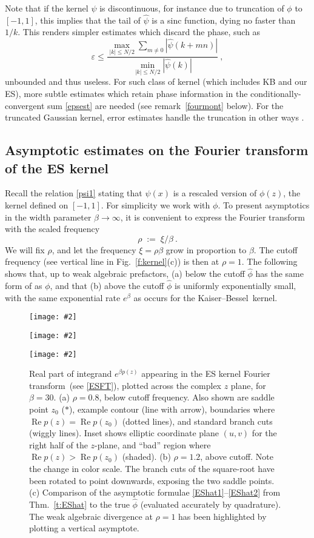 \documentclass[10pt]{article}
\newcommand{\be}{\begin{equation}}
\newcommand{\ee}{\end{equation}}
\newcommand{\bfi}{\begin{figure}}
\newcommand{\efi}{\end{figure}}
\newcommand{\ca}[2]{\caption{#1 \label{#2}}}
\newcommand{\bmp}[1]{\begin{minipage}{#1}}
\newcommand{\emp}{\end{minipage}}
\newcommand{\pig}[2]{\bmp{#1}\texttt{[image: \#2]}\emp}
\newcommand{\eps}{\varepsilon}
\DeclareMathOperator{\re}{Re}
\newcommand{\freq}{\beta}          %
\newcommand{\KB}{Kaiser--Bessel}
\newcommand{\FT}{Fourier transform}
\begin{document}
Note that if the kernel $\psi$ is discontinuous, for instance due to
truncation of $\phi$ to $[-1,1]$, this implies that the tail of $\hat\psi$
is a sinc function, dying no faster than $1/k$.
This renders simpler estimates which discard the phase, such as
$$
\eps \le
\frac{\max_{|k|\le N/2} \sum_{m\neq 0} |\hat\psi(k+mn)|}{\min_{|k|\le N/2} |\hat\psi(k)|}~,
$$
unbounded and thus useless.
For such class of kernel (which includes KB and our ES),
more subtle estimates which retain phase information in the
conditionally-convergent sum \eqref{epsest} are needed
(see remark~\ref{fourmont} below).
For the truncated Gaussian kernel, error estimates handle
the truncation in other ways \cite{nufft,elbel,nfftchap}.



\subsection{Asymptotic estimates on the Fourier transform of the ES kernel}

Recall the relation \eqref{psi1} stating that $\psi(x)$ is a rescaled
version of $\phi(z)$, the kernel defined on $[-1,1]$.
For simplicity we work with $\phi$.
To present asymptotics in the width parameter $\freq\to\infty$,
it is convenient to express the Fourier transform with the scaled frequency
\be
\rho \;:=\; \xi/\freq ~.
\label{rho}
\ee
We will fix $\rho$, and let the frequency $\xi=\rho\freq$ grow in proportion
to $\freq$. The cutoff frequency (see vertical line
in Fig.~\ref{f:kernel}(c)) is then at $\rho=1$.
The following shows that, up to weak algebraic prefactors,
(a) below the cutoff $\hat\phi$ has the same form of as $\phi$,
and that (b) above the cutoff $\hat\phi$ is uniformly exponentially small,
with the same exponential rate $e^\beta$ as occurs for the \KB\ kernel.

\bfi[t] %
\pig{2.2in}{saddlea_lab}
\pig{2.2in}{saddleb_lab}
\pig{2.2in}{saddleft}
\ca{
  Real part of integrand $e^{\freq p(z)}$
  appearing in the ES kernel \FT\
  (see \eqref{ESFT}),
  plotted across the complex $z$ plane, for $\freq=30$.
  (a) $\rho=0.8$, below cutoff frequency.
  Also shown are saddle point $z_0$ ($\ast$), example contour (line with arrow),
  boundaries where $\re p(z) = \re p(z_0)$ (dotted lines),
  and standard branch cuts (wiggly lines).
  Inset shows elliptic coordinate plane $(u,v)$ for the right half of the
  $z$-plane, and ``bad'' region where $\re p(z) > \re p(z_0)$ (shaded).
  (b) $\rho =1.2$, above cutoff.
  Note the change in color scale. The branch cuts of the square-root have
  been rotated to point downwards, exposing the two saddle points.
  (c) Comparison of the asymptotic formulae \eqref{EShat1}--\eqref{EShat2}
  from Thm.~\ref{t:EShat}
  to the true $\hat\phi$ (evaluated accurately by quadrature).
  The weak algebraic divergence at $\rho=1$ has been highlighted by plotting
  a vertical asymptote.
}{f:saddle}
\efi
\end{document}
